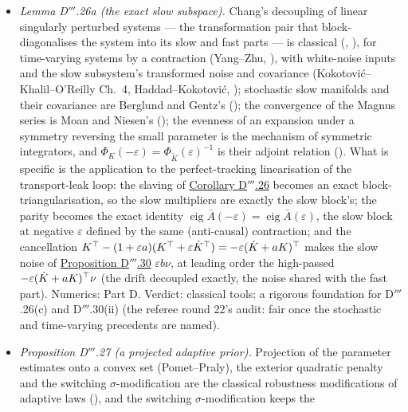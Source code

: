 \begin{itemize}
    Numerics: . Verdict: classical tools, a new structural statement (an exact,
    $m$-independent spectrum at every representable sample, with the explicit second-order coefficient of this loop).
  \item \emph{Lemma D$'''$.26a (the exact slow subspace).} Chang's decoupling of linear singularly perturbed systems
    --- the transformation pair that block-diagonalises the system into its slow and fast parts --- is classical
    (\cite{S59}, \cite{kko1986}), for time-varying systems by a contraction (Yang--Zhu, \cite{S59}), with white-noise
    inputs and the slow subsystem's transformed noise and covariance (Kokotovi\'c--Khalil--O'Reilly Ch.~4,
    Haddad--Kokotovi\'c, \cite{S59}); stochastic slow manifolds and their covariance are Berglund and Gentz's
    (\cite{S59}); the convergence of the Magnus series is Moan and Niesen's (\cite{S59}); the evenness of an expansion
    under a symmetry reversing the small parameter is the mechanism of symmetric integrators, and
    $\Phi_K(-\varepsilon) = \Phi_{\tilde K}(\varepsilon)^{-1}$ is their adjoint relation (\cite{S56}). What is
    specific is the application to the perfect-tracking linearisation of the transport-leak loop: the slaving of
    \hyperref[res:thmDppp:26]{Corollary D$'''$.26} becomes an exact block-triangularisation, so the slow multipliers
    are exactly the slow block's; the parity becomes the exact identity
    $\operatorname{eig}\bar A(-\varepsilon) = \operatorname{eig}\bar A(\varepsilon)$, the slow block at negative
    $\varepsilon$ defined by the same (anti-causal) contraction; and the cancellation
    $K^\top - (1 + \varepsilon a)(K^\top + \varepsilon\dot K^\top) = -\varepsilon(\dot K + aK)^\top$ makes the slow noise of
    \hyperref[res:thmDppp:30]{Proposition D$'''$.30} $\varepsilon b\nu$, at leading order the high-passed
    $-\varepsilon(\dot K + aK)^\top\nu$ (the drift decoupled exactly, the noise shared with the fast part). Numerics:
     Part D. Verdict: classical tools; a rigorous foundation for D$'''$.26(c) and
    D$'''$.30(ii) (the referee round 22's audit: fair once the stochastic and time-varying precedents are named).
  \item \emph{Proposition D$'''$.27 (a projected adaptive prior).} Projection of the parameter estimates onto a convex
    set (Pomet--Praly), the exterior quadratic penalty and the switching $\sigma$-modification are the classical
    robustness modifications of adaptive laws (\cite{ioannou1996}), and the switching $\sigma$-modification keeps the

\end{itemize}
